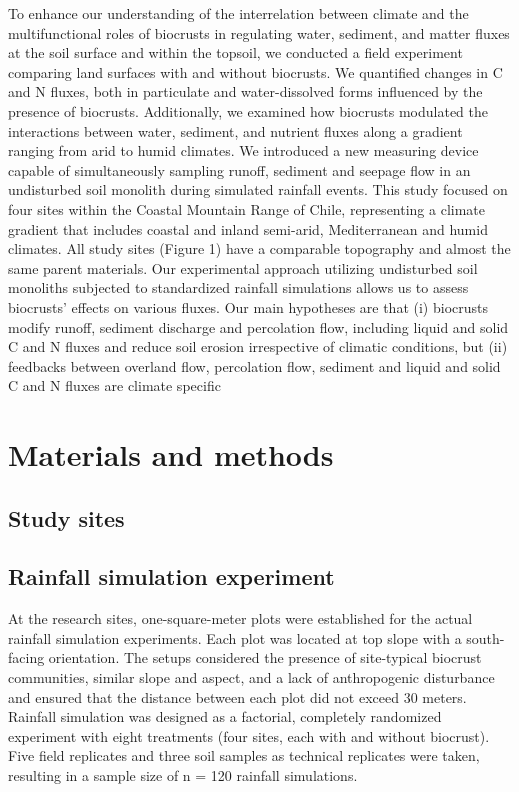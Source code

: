 To enhance our understanding of the interrelation between climate and the multifunctional roles of biocrusts in regulating water, sediment, and matter fluxes at the soil surface and within the topsoil, we conducted a field experiment comparing land surfaces with and without biocrusts. We quantified changes in C and N fluxes, both in particulate and water-dissolved forms influenced by the presence of biocrusts. Additionally, we examined how biocrusts modulated the interactions between water, sediment, and nutrient fluxes along a gradient ranging from arid to humid climates. We introduced a new measuring device capable of simultaneously sampling runoff, sediment and seepage flow in an undisturbed soil monolith during simulated rainfall events. This study focused on four sites within the Coastal Mountain Range of Chile, representing a climate gradient that includes coastal and inland semi-arid, Mediterranean and humid climates. All study sites (Figure 1) have a comparable topography and almost the same parent materials. Our experimental approach utilizing undisturbed soil monoliths subjected to standardized rainfall simulations allows us to assess biocrusts' effects on various fluxes. Our main hypotheses are that (i) biocrusts modify runoff, sediment discharge and percolation flow, including liquid and solid C and N fluxes and reduce soil erosion irrespective of climatic conditions, but (ii) feedbacks between overland flow, percolation flow, sediment and liquid and solid C and N fluxes are climate specific

\section{Materials and methods}
\subsection{Study sites}
\subsection{Rainfall simulation experiment}

At the research sites, one-square-meter plots were established for the actual rainfall simulation experiments. Each plot was located at top slope with a south-facing orientation. The setups considered the presence of site-typical biocrust communities, similar slope and aspect, and a lack of anthropogenic disturbance and ensured that the distance between each plot did not exceed 30 meters. Rainfall simulation was designed as a factorial, completely randomized experiment with eight treatments (four sites, each with and without biocrust). Five field replicates and three soil samples as technical replicates were taken, resulting in a sample size of n = 120 rainfall simulations.

